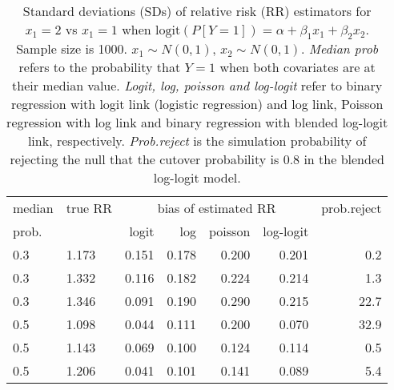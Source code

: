 \documentclass[12pt,a4paper]{article}
\begin{document}
\begin{table}[H] 
\small\sf\centering 
\caption{Standard deviations (SDs) of relative risk (RR) estimators for $x_1=2$ vs $x_1=1$ when $\mbox{logit}(P[Y=1])=\alpha+\beta_1 x_1 + \beta_2 x_2$. Sample size is 1000. $x_1 \sim $$N(0,1)$, $x_2 \sim N(0,1)$. {\it Median prob} refers to the probability that $Y=1$ when both covariates are at their median value. {\it Logit, log, poisson and log-logit} refer to binary regression with logit link (logistic regression) and log link, Poisson regression with log link and binary regression with blended log-logit link, respectively. {\it Prob.reject} is the simulation probability of rejecting the null that the cutover probability is $0.8$ in the blended log-logit model.} 
\begin{tabular}{llrrrrr} 
\toprule 
median & true RR & \multicolumn{4}{c}{bias of estimated RR} & prob.reject \\ 
prob. & & logit & log & poisson & log-logit  & \\ \midrule 
0.3 & 1.173 & 0.151 & 0.178 & 0.200 & 0.201 &  0.2 \\  
0.3 & 1.332 & 0.116 & 0.182 & 0.224 & 0.214 &  1.3 \\  
0.3 & 1.346 & 0.091 & 0.190 & 0.290 & 0.215 & 22.7 \\  
0.5 & 1.098 & 0.044 & 0.111 & 0.200 & 0.070 & 32.9 \\  
0.5 & 1.143 & 0.069 & 0.100 & 0.124 & 0.114 &  0.5 \\  
0.5 & 1.206 & 0.041 & 0.101 & 0.141 & 0.089 &  5.4 \\  
\bottomrule 
\end{tabular} 
\end{table} 
\end{document}
